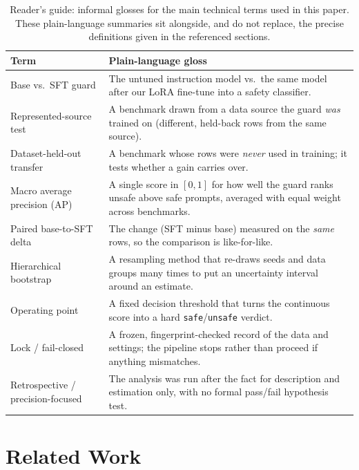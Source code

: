 \documentclass[11pt]{article}
\begin{document}
\begin{table}[!htbp]
\centering
\small
\caption{Reader's guide: informal glosses for the main technical terms used in this paper. These plain-language summaries sit alongside, and do not replace, the precise definitions given in the referenced sections.}
\label{tab:readers-guide}
\begin{tabular}{@{}p{}p{}@{}}
\toprule
Term & Plain-language gloss \\
\midrule
Base vs.\ SFT guard & The untuned instruction model vs.\ the same model after our LoRA fine-tune into a safety classifier. \\
Represented-source test & A benchmark drawn from a data source the guard \emph{was} trained on (different, held-back rows from the same source). \\
Dataset-held-out transfer & A benchmark whose rows were \emph{never} used in training; it tests whether a gain carries over. \\
Macro average precision (AP) & A single score in $[0,1]$ for how well the guard ranks unsafe above safe prompts, averaged with equal weight across benchmarks. \\
Paired base-to-SFT delta & The change (SFT minus base) measured on the \emph{same} rows, so the comparison is like-for-like. \\
Hierarchical bootstrap & A resampling method that re-draws seeds and data groups many times to put an uncertainty interval around an estimate. \\
Operating point & A fixed decision threshold that turns the continuous score into a hard \texttt{safe}/\texttt{unsafe} verdict. \\
Lock / fail-closed & A frozen, fingerprint-checked record of the data and settings; the pipeline stops rather than proceed if anything mismatches. \\
Retrospective / precision-focused & The analysis was run after the fact for description and estimation only, with no formal pass/fail hypothesis test. \\
\bottomrule
\end{tabular}
\end{table}

\section{Related Work}
\label{sec:related}
\end{document}
